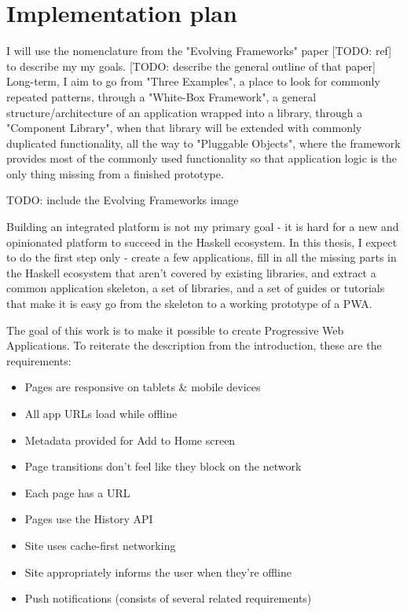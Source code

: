 \documentclass[english,odsaz]{fitthesis}
\begin{document}
\section{Implementation plan}
\label{sec:orgf5ff4ce}
I will use the nomenclature from the "Evolving Frameworks" paper [TODO: ref] to
describe my my goals. [TODO: describe the general outline of that paper]
Long-term, I aim to go from "Three Examples", a place to look for commonly
repeated patterns, through a "White-Box Framework", a general
structure/architecture of an application wrapped into a library, through a
"Component Library", when that library will be extended with commonly duplicated
functionality, all the way to "Pluggable Objects", where the framework provides
most of the commonly used functionality so that application logic is the only
thing missing from a finished prototype.

TODO: include the Evolving Frameworks image

Building an integrated platform is not my primary goal - it is hard for a new
and opinionated platform to succeed in the Haskell ecosystem. In this thesis, I
expect to do the first step only - create a few applications, fill in all the
missing parts in the Haskell ecosystem that aren't covered by existing
libraries, and extract a common application skeleton, a set of libraries, and a
set of guides or tutorials that make it is easy go from the skeleton to a
working prototype of a PWA.

The goal of this work is to make it possible to create Progressive Web
Applications. To reiterate the description from the introduction, these are the
requirements:
\begin{itemize}
\item Pages are responsive on tablets \& mobile devices
\item All app URLs load while offline
\item Metadata provided for Add to Home screen
\item Page transitions don't feel like they block on the network
\item Each page has a URL
\item Pages use the History API
\item Site uses cache-first networking
\item Site appropriately informs the user when they're offline
\item Push notifications (consists of several related requirements)
\end{itemize}
\end{document}
